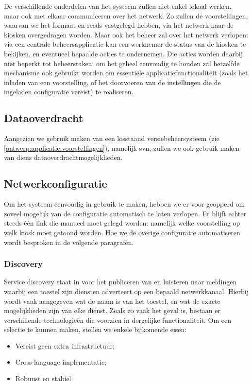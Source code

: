 De verschillende onderdelen van het systeem zullen niet enkel lokaal werken, maar ook met elkaar communiceren over het netwerk. Zo zullen de voorstellingen, waarvan we het formaat en reeds vastgelegd hebben, via het netwerk naar de kiosken overgedragen worden. Maar ook het beheer zal over het netwerk verlopen: via een centrale beheersapplicatie kan een werknemer de status van de kiosken te bekijken, en eventueel bepaalde acties te ondernemen. Die acties worden daarbij niet beperkt tot beheerstaken: om het geheel eenvoudig te houden zal hetzelfde mechanisme ook gebruikt worden om essentiële applicatiefunctionaliteit (zoals het inladen van een voorstelling, of het doorvoeren van de instellingen die de ingeladen configuratie vereist) te realiseren.

\subsection{Dataoverdracht}

Aangezien we gebruik maken van een losstaand versiebeheersysteem (zie \ref{ontwerp:applicatie:voorstellingen}), namelijk \ac{svn}, zullen we ook gebruik maken van diens dataoverdrachtmogelijkheden.

\subsection{Netwerkconfiguratie}

Om het systeem eenvoudig in gebruik te maken, hebben we er voor geopperd om zoveel mogelijk van de configuratie automatisch te laten verlopen. Er blijft echter steeds één link die manueel moet gelegd worden: namelijk welke voorstelling op welk kiosk moet getoond worden. Hoe we de overige configuratie automatiseren wordt besproken in de volgende paragrafen.

\subsubsection{Discovery}

Service discovery staat in voor het publiceren van en luisteren naar meldingen waarbij een toestel zijn diensten adverteert op een bepaald netwerkkanaal. Hierbij wordt vaak aangegeven wat de naam is van het toestel, en wat de exacte mogelijkheden zijn van elke dienst.
Zoals zo vaak het geval is, bestaan er verschillende technologieën die voorzien in dergelijke functionaliteit. Om een selectie te kunnen maken, stellen we enkele bijkomende eisen: 
\begin{itemize}
\item Vereist geen extra infrastructuur;
\item Cross-language implementatie;
\item Robuust en stabiel.
\end{itemize}

